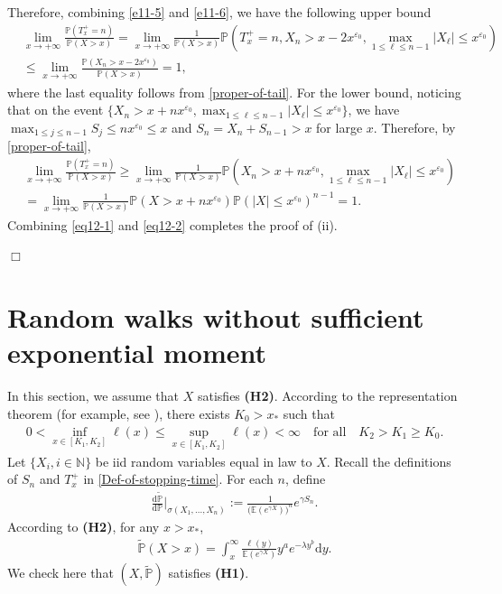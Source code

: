 \documentclass[10pt,a4paper]{amsart}
\numberwithin{equation}{section}
\begin{document}
Therefore, combining \eqref{e11-5} and \eqref{e11-6}, we have the following upper bound
\begin{align}\label{eq12-1}
	& \lim_{x\to+\infty} \frac{\mathbb{P}\left(T_x^+=n\right)}{\mathbb{P}(X>x)}  = \lim_{x\to+\infty} \frac{1}{\mathbb{P}(X>x)}\mathbb{P}\left(T_x^+=n,  X_n > x-2x^{\varepsilon_0}, \max_{1\leq  \ell \leq n-1} |X_\ell | \leq  x^{\varepsilon_0}\right) \nonumber\\
	&\leq \lim_{x\to+\infty} \frac{\mathbb{P}\left(X_n > x-2x^{\varepsilon_0}\right)}{\mathbb{P}(X>x)}=1,
\end{align}
where the last equality follows from \eqref{proper-of-tail}. For the lower bound, noticing that on the event $\{ X_n > x+nx^{\varepsilon_0},\max_{ 1\leq \ell \leq n-1} |X_\ell| \leq x^{\varepsilon_0}\}$, we have $\max_{1\leq j\leq n-1} S_j \leq nx^{\varepsilon_0} \leq x$ and $S_n =X_n+S_{n-1}>x$ for large $x$. Therefore,
by \eqref{proper-of-tail},   
\begin{align}\label{eq12-2}
	& \lim_{x\to+\infty} \frac{\mathbb{P}\left(T_x^+=n\right)}{\mathbb{P}(X>x)} \geq \lim_{x\to+\infty} \frac{1}{\mathbb{P}(X>x)}\mathbb{P}\left(X_n > x+nx^{\varepsilon_0},\max_{ 1\leq \ell \leq n-1} |X_\ell| \leq x^{\varepsilon_0} \right) \nonumber\\
	&= \lim_{x\to+\infty} \frac{1}{\mathbb{P}(X>x)}\mathbb{P}\left(X> x+nx^{\varepsilon_0}\right) \mathbb{P}\left( |X| \leq x^{\varepsilon_0} \right)^{n-1}=1.
\end{align}
Combining \eqref{eq12-1} and \eqref{eq12-2} completes the proof of (ii).

\hfill$\Box$



\section{Random walks without sufficient exponential moment}\label{S3}

 In this section, we assume that $X$ satisfies {\bf(H2)}. According to the representation theorem (for example, see \cite[Theorem 1.3.1, p.12]{BGT1987}), there exists $K_0>x_*$  such that 
 \begin{align}\label{Def-of-K-0}
 	0< \inf_{x\in [K_1, K_2]} \ell(x) \leq \sup_{x\in [K_1, K_2]} \ell(x)<\infty \quad\mbox{for all}\quad K_2>K_1\geq K_0.
 \end{align}
 Let $\{X_i, i\in\mathbb{N}\}$ be iid random variables equal in law to $X$. Recall the definitions of $S_n$ and $T_x^+$ in \eqref{Def-of-stopping-time}.  For each $n$, define 
 \begin{align}\label{Change-of-measure}
 	\frac{\mathrm{d} \widetilde{\mathbb{P}}}{\mathrm{d} \mathbb{P}}\bigg|_{\sigma(X_1,...,X_n)}:= \frac{1}{\big(\mathbb{E}(e^{\gamma X})\big)^n} e^{\gamma S_n}.
 \end{align}
 According to {\bf(H2)}, for any $x>x_*$,
 \begin{align}\label{density-X-tildeP}
 	\widetilde{\mathbb{P}}(X>x)= \int_x^\infty \frac{\ell(y)}{\mathbb{E}(e^{\gamma X})} y^a e^{-\lambda y^b}\mathrm{d}y.
 \end{align}
We check here that $(X, \widetilde{\mathbb P})$ satisfies {\bf(H1)}. 
\end{document}
